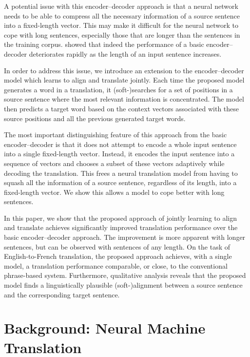 A potential issue with this encoder--decoder approach is that a neural network
needs to be able to compress all the necessary information of a source sentence
into a fixed-length vector.  This may make it difficult for the neural network
to cope with long sentences, especially those that are longer than the
sentences in the training corpus.  \citet{Cho2014a} showed that indeed the
performance of a basic encoder--decoder deteriorates rapidly as the length of
an input sentence increases. 

In order to address this issue, we introduce an extension to the
encoder--decoder model which learns to align and translate jointly. Each time
the proposed model generates a word in a translation, it \mbox{(soft-)searches}
for a set of positions in a source sentence where the most relevant information
is concentrated.  The model then predicts a target word based on the context
vectors associated with these source positions and all the previous generated
target words. 

The most important distinguishing feature of this approach from the basic
encoder--decoder is that it does not attempt to encode a whole input sentence
into a single fixed-length vector. Instead, it encodes the input sentence into
a sequence of vectors and chooses a subset of these vectors adaptively while
decoding the translation. This frees a neural translation model from having to
squash all the information of a source sentence, regardless of its length, into
a fixed-length vector. We show this allows a model to cope better with long
sentences.

In this paper, we show that the proposed approach of jointly learning to align
and translate achieves significantly improved translation performance over the
basic encoder--decoder approach. The improvement is more apparent with longer
sentences, but can be observed with sentences of any length. On the task of
English-to-French translation, the proposed approach achieves, with a single
model, a translation performance comparable, or close, to the conventional
phrase-based system.  Furthermore, qualitative analysis reveals that the
proposed model finds a linguistically plausible \mbox{(soft-)alignment} between
a source sentence and the corresponding target sentence.


\section{Background: Neural Machine Translation}

